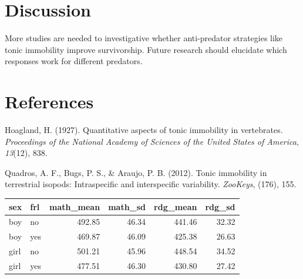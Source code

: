 \documentclass[man]{apa6}
\begin{document}
\hypertarget{discussion}{%
\section{Discussion}\label{discussion}}

More studies are needed to investigative whether anti-predator strategies like tonic immobility improve survivorship. Future research should elucidate which responses work for different predators.
\newpage

\hypertarget{references}{%
\section{References}\label{references}}

\begingroup
\setlength{\parindent}{-0.5in}
\setlength{\leftskip}{0.5in}

\hypertarget{refs}{}
\leavevmode\hypertarget{ref-hoagland1927}{}%
Hoagland, H. (1927). Quantitative aspects of tonic immobility in vertebrates. \emph{Proceedings of the National Academy of Sciences of the United States of America}, \emph{13}(12), 838.

\leavevmode\hypertarget{ref-quadros2012}{}%
Quadros, A. F., Bugs, P. S., \& Araujo, P. B. (2012). Tonic immobility in terrestrial isopods: Intraspecific and interspecific variability. \emph{ZooKeys}, (176), 155.

\endgroup

\newpage

\begin{table}[H]
\centering
\begin{tabular}{l|l|r|r|r|r}
\hline
sex & frl & math\_mean & math\_sd & rdg\_mean & rdg\_sd\\
\hline
boy & no & 492.85 & 46.34 & 441.46 & 32.32\\
\hline
boy & yes & 469.87 & 46.09 & 425.38 & 26.63\\
\hline
girl & no & 501.21 & 45.96 & 448.54 & 34.52\\
\hline
girl & yes & 477.51 & 46.30 & 430.80 & 27.42\\
\hline
\end{tabular}
\end{table}

\newpage
\end{document}
